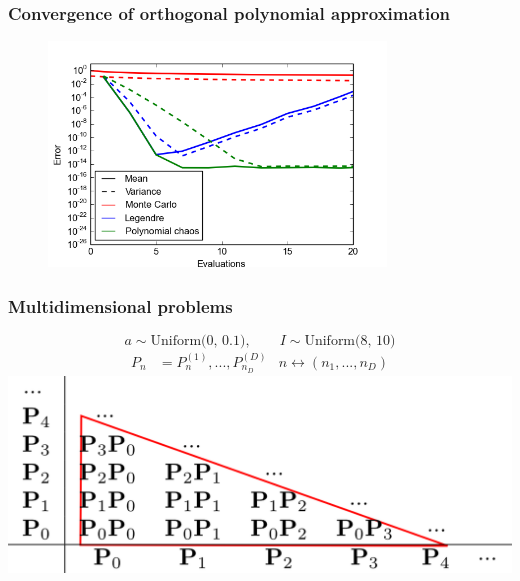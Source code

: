\documentclass{beamer}
\begin{document}
\begin{frame}
\frametitle{Convergence of orthogonal polynomial approximation}

  \begin{figure}
    \includegraphics[width=0.8\textwidth]{MC_convergence_1D_3.png}
  \end{figure}
   \end{frame}


\begin{frame}
 \frametitle{Multidimensional problems}
 
 \[a \sim \text{Uniform(0, 0.1)}, \qquad I \sim \text{Uniform(8, 10)}\] 
 \pause
  \begin{align*}
  P_n &= P^{(1)}_n, ..., P^{(D)}_{n_D}
  & n\longleftrightarrow (n_1, ..., n_D)
  \end{align*}
  \pause
  \includegraphics[width=\textwidth]{multidim.png}
   
 \end{frame}
\end{document}
